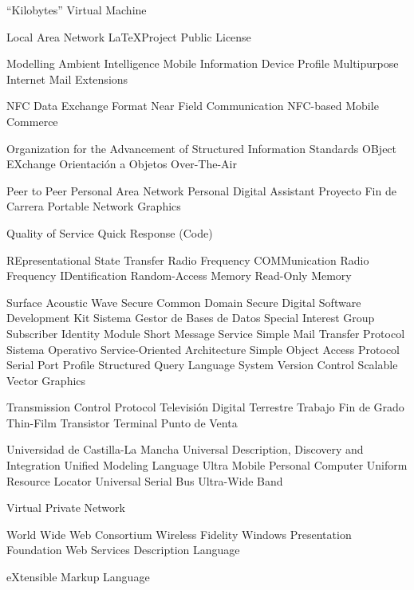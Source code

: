 {\begin{acronym}[XXXXXXXX]
       {``Kilobytes'' Virtual Machine}

       {Local Area Network}
      {\LaTeX Project Public License}

      {Modelling Ambient Intelligence}
      {Mobile Information Device Profile}
      {Multipurpose Internet Mail Extensions}

      {NFC Data Exchange Format}
       {Near Field Communication}
       {NFC-based Mobile Commerce}

     {Organization for the Advancement of Structured Information Standards}
      {OBject EXchange}
        {Orientación a Objetos}
       {Over-The-Air}

       {Peer to Peer}
       {Personal Area Network}
       {Personal Digital Assistant}
       {Proyecto Fin de Carrera}
       {Portable Network Graphics}

       {Quality of Service}
        {Quick Response (Code)}


      {REpresentational State Transfer}
    {Radio Frequency COMMunication}
      {Radio Frequency IDentification}
       {Random-Access Memory}
       {Read-Only Memory}

       {Surface Acoustic Wave}
       {Secure Common Domain}
        {Secure Digital}
       {Software Development Kit}
      {Sistema Gestor de Bases de Datos}
       {Special Interest Group}
       {Subscriber Identity Module}
       {Short Message Service}
      {Simple Mail Transfer Protocol}
        {Sistema Operativo}
       {Service-Oriented Architecture}
      {Simple Object Access Protocol}
       {Serial Port Profile}
       {Structured Query Language}
       {System Version Control}
       {Scalable Vector Graphics}

       {Transmission Control Protocol}
       {Televisión Digital Terrestre}
       {Trabajo Fin de Grado}
       {Thin-Film Transistor}
       {Terminal Punto de Venta}

      {Universidad de Castilla-La Mancha}
      {Universal Description, Discovery and Integration}
       {Unified Modeling Language}
      {Ultra Mobile Personal Computer}
       {Uniform Resource Locator}
       {Universal Serial Bus}
       {Ultra-Wide Band}

       {Virtual Private Network}

       {World Wide Web Consortium}
      {Wireless Fidelity}
       {Windows Presentation Foundation}
      {Web Services Description Language}

       {eXtensible Markup Language}
\end{acronym}
}



